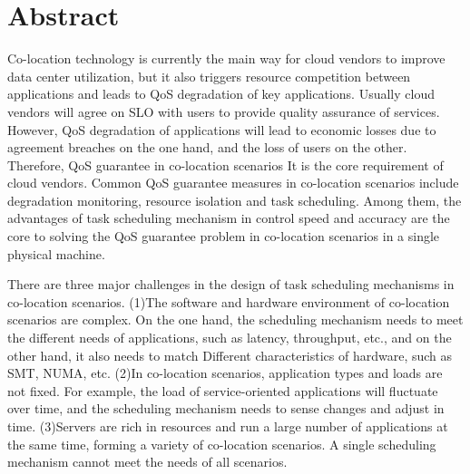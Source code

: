 \intobmk\chapter*{Abstract}%

Co-location technology is currently the main way for cloud vendors to improve data center utilization, but it also triggers resource competition between applications and leads to QoS degradation of key applications. Usually cloud vendors will agree on SLO with users to provide quality assurance of services. However, QoS degradation of applications will lead to economic losses due to agreement breaches on the one hand, and the loss of users on the other. Therefore, QoS guarantee in co-location scenarios It is the core requirement of cloud vendors. Common QoS guarantee measures in co-location scenarios include degradation monitoring, resource isolation and task scheduling. Among them, the advantages of task scheduling mechanism in control speed and accuracy are the core to solving the QoS guarantee problem in co-location scenarios in a single physical machine.

There are three major challenges in the design of task scheduling mechanisms in co-location scenarios. (1)The software and hardware environment of co-location scenarios are complex. On the one hand, the scheduling mechanism needs to meet the different needs of applications, such as latency, throughput, etc., and on the other hand, it also needs to match Different characteristics of hardware, such as SMT, NUMA, etc. (2)In co-location scenarios, application types and loads are not fixed. For example, the load of service-oriented applications will fluctuate over time, and the scheduling mechanism needs to sense changes and adjust in time. (3)Servers are rich in resources and run a large number of applications at the same time, forming a variety of co-location scenarios. A single scheduling mechanism cannot meet the needs of all scenarios.

